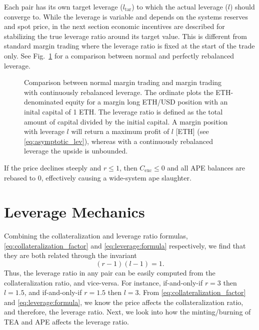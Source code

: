 \documentclass[journal,letterpaper,oneside,onecolumn,12pt]{IEEEtran}
\begin{document}
	Each pair has its own target leverage ($l_\textrm{tar}$) to which the actual leverage ($l$) should converge to.
	While the leverage is variable and depends on the systems reserves and spot price, in the next section economic incentives are described for stabilizing the true leverage ratio around its target value. This is different from standard margin trading where the leverage ratio is fixed at the start of the trade only. See Fig.~\ref{fig:leverage} for a comparison between normal and perfectly rebalanced leverage.
	\begin{figure}
		\centering
		\caption{Comparison between normal margin trading and margin trading with continuously rebalanced leverage. The ordinate plots the ETH-denominated equity for a margin long ETH/USD position with an inital capital of 1 ETH. The leverage ratio is defined as the total amount of capital divided by the initial capital. A margin position with leverage $l$ will return a maximum profit of $l$ [ETH] (see \eqref{eq:asymptotic_lev}), whereas with a continuously rebalanced leverage the upside is unbounded.}
		\label{fig:leverage}
	\end{figure} 
	If the price declines steeply and $r\leq1$, then $C_\text{exc}\leq0$ and all APE balances are rebased to 0, effectively causing a wide-system ape slaughter.


	



	\section{Leverage Mechanics} \label{sec:leverage}
	
	Combining the collateralization and leverage ratio formulas, \eqref{eq:collateralization_factor} and  \eqref{eq:leverage:formula} respectively, we find that they are both related through the invariant
	\begin{equation} \label{eq:leverage:invariant}
		(r-1)(l-1) = 1.
	\end{equation}
	Thus, the leverage ratio in any pair can be easily computed from the collateralization ratio, and vice-versa. For instance, if-and-only-if $r=3$ then $l=1.5$, and if-and-only-if $r=1.5$ then $l=3$. From \eqref{eq:collateralization_factor} and \eqref{eq:leverage:formula}, we know the price affects the collateralization ratio, and therefore, the leverage ratio. Next, we look into how the minting/burning of TEA and APE affects the leverage ratio.
	
\end{document}
